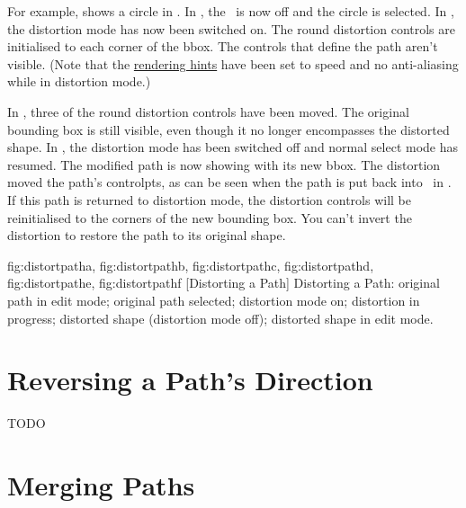 For example,  shows a circle in 
\editpathmode. In , the \editpathmode\ is now off and
the circle is selected. In , the
distortion mode has now been switched on. The round distortion
controls are initialised to each corner of the \gls{bbox}. The
controls that define the path aren't visible. (Note that the
\hyperref[sec:graphics]{rendering hints} have been set to speed
and no anti-aliasing while in distortion mode.)

In , three of the round distortion
controls have been moved. The original bounding box is still
visible, even though it no longer encompasses the distorted shape.
In , the distortion mode has been
switched off and normal select mode has resumed. The modified path
is now showing with its new \gls{bbox}. The distortion moved the
path's \glspl{controlpt}, as can be seen when the path is put back into
\editpathmode\ in . If this path is
returned to distortion mode, the distortion controls will be reinitialised to
the corners of the new bounding box. You can't invert the distortion
to restore the path to its original shape.

{
  {fig:distortpatha}{}{},
  {fig:distortpathb}{}{},
  {fig:distortpathc}{}{},
  {fig:distortpathd}{}{},
  {fig:distortpathe}{}{},
  {fig:distortpathf}{}{}
}
[Distorting a Path]
{Distorting a Path: 
 original path in edit mode;
 original path selected;
 distortion mode on;
 distortion in progress;
 distorted shape (distortion mode off);
 distorted shape in edit mode.}

\section{Reversing a Path's Direction}\label{sec:reversing}


TODO


\section{Merging Paths}\label{sec:mergepaths}

